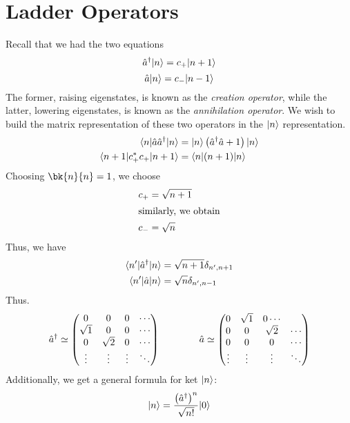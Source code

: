 \section{Ladder Operators}
Recall that we had the two equations
\[\hat a ^{\dagger} \lvert n\rangle = c_+ \lvert n+1\rangle\]
\[\hat a \lvert n\rangle = c_-\lvert n-1\rangle\]
The former, raising eigenstates, is known as the \emph{creation operator}, while the latter, lowering eigenstates, is known as the \emph{annihilation operator}.
We wish to build the matrix representation of these two operators in the \(\lvert n\rangle\) representation.
\begin{align*}
	\b n \hat a \hat a \adj \k n &= \k n \left(\hat a \adj \hat a + 1\right)\k n\\
	\b{n+1}c_+\ast c_+ \k{n+1} &= \b{n}(n+1)\k{n}
\end{align*}
Choosing \(\bk{n}{n}=1\), we choose
\begin{subequations}
	\begin{align}
		c_+&=\sqrt{n+1}\\
		\intertext{similarly, we obtain}
		c_-&=\sqrt{n}
	\end{align}
\end{subequations}
Thus, we have
\begin{align*}
	\langle n'\rvert\hat a ^{\dagger} \lvert n\rangle&=\sqrt{n+1}\delta_{n',n+1}\\
	\langle n'\rvert\hat a \lvert n\rangle &= \sqrt{n}\delta_{n',n-1}
\end{align*}
Thus.
\begin{equation}
	\hat a ^{\dagger} \simeq \begin{pmatrix}
		0 & 0 & 0 &\cdots \\
		\sqrt{1} & 0 & 0 &\cdots\\
		0 & \sqrt{2} & 0 & \cdots\\
		\vdots & \vdots & \vdots & \ddots
	\end{pmatrix} \qquad\qquad \hat a \simeq \begin{pmatrix}
		0 & \sqrt{1} & 0 \cdots\\
		0 & 0 & \sqrt{2} & \cdots\\
		0 & 0 & 0 & \cdots\\
		\vdots & \vdots & \vdots & \ddots
	\end{pmatrix}
\end{equation}
Additionally, we get a general formula for ket \(\lvert n\rangle\):
\begin{equation}
	\lvert n\rangle = \frac{\left(\hat a ^{\dagger} \right)^n}{\sqrt{n!}}\lvert0\rangle\label{eq7:raise}
\end{equation}

